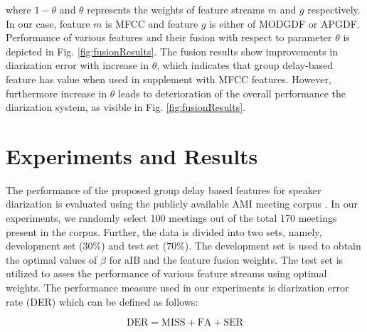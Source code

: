 \documentclass[conference]{IEEEtran}
\begin{document}
where $1-\theta$ and $\theta$ represents the weights of feature streams $m$ and
$g$ respectively. In our case, feature $m$ is MFCC and feature $g$ is either of
MODGDF or APGDF. Performance of various features and their fusion with respect
to parameter $\theta$ is depicted in Fig. \ref{fig:fusionResults}. The fusion
results show improvements in diarization error with increase in $\theta$, which
indicates that group delay-based feature has value when used in supplement with
MFCC features. However, furthermore increase in $\theta$ leads to deterioration
of the overall performance the diarization system, as visible in Fig.
\ref{fig:fusionResults}.   



\section{Experiments and Results }
\label{experimentsNresults}

The performance of the proposed group delay based features for speaker
diarization is evaluated using the publicly available AMI meeting corpus
\cite{AMIData}. In our experiments, we randomly select 100 meetings out of the
total 170 meetings present in the corpus. Further, the data is divided into two
sets, namely, development set ($30\%$) and test set ($70\%$).  The development
set is used to obtain the optimal values of $\beta$ for aIB and the
feature fusion weights. The test set is utilized to asses
the performance of various feature streams using optimal weights. The
performance measure used in our experiments is diarization error rate (DER)
which can be defined as follows: 

\begin{equation}
\text{DER} = \text{MISS} + \text{FA} + \text{SER}
\end{equation}

\end{document}
